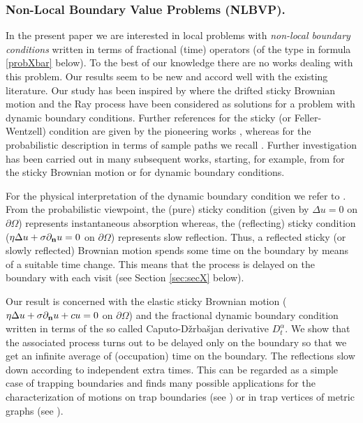 \documentclass[11pt,a4paper]{article}
\begin{document}
\subsubsection{Non-Local Boundary Value Problems (NLBVP).} In the present paper we are interested in local problems with \emph{non-local boundary conditions} written in terms of fractional (time) operators (of the type in formula \eqref{probXbar} below). To the best of our knowledge there are no works dealing with this problem. Our results seem to be new and accord well with the existing literature. Our study has been inspired by \cite{SW05} where the drifted sticky Brownian motion and the Ray process have been considered as solutions for a problem with dynamic boundary conditions. Further references for the sticky (or Feller-Wentzell) condition are given by the pioneering works \cite{Feller52, Wentzell59}, whereas for the probabilistic description in terms of sample paths we recall \cite[Section 10]{ItoMcK}. Further investigation has been carried out in many subsequent works, starting, for example, from \cite{Amir91, Warren97} for the sticky Brownian motion or \cite{CleTim86, TaiFavRom2000} for dynamic boundary conditions. 

For the physical interpretation of the dynamic boundary condition we refer to \cite{Gold2006}. From the probabilistic viewpoint, the (pure) sticky condition (given by $\Delta u=0$ on $\partial \Omega$) represents instantaneous absorption whereas, the (reflecting) sticky condition ($\eta \Delta u + \sigma \partial_{\bf n} u=0$ on $\partial \Omega$) represents slow reflection. Thus, a reflected sticky (or slowly reflected) Brownian motion spends some time on the boundary by means of a suitable time change. This means that the process is delayed on the boundary with each visit (see Section \ref{sec:secX} below).

Our result is concerned with the elastic sticky Brownian motion ($\eta \Delta u + \sigma \partial_{\bf n}u + c u = 0$ on $\partial \Omega$) and the fractional dynamic boundary condition written in terms of the so called Caputo-D\v{z}rba\v{s}jan derivative $D^\alpha_t$. We show that the associated process turns out to be delayed only on the boundary so that we get an infinite average of (occupation) time on the boundary. The reflections slow down according to independent extra times. This can be regarded as a simple case of trapping boundaries and finds many possible applications for the characterization of motions on trap boundaries (see \cite{BCM06}) or in trap vertices of metric graphs (see \cite{ColDov, BonDov}). 
\end{document}
